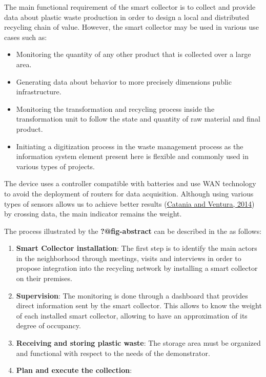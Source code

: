 \documentclass[
  11pt,
]{article}
\providecommand{\tightlist}{%
  \setlength{\itemsep}{0pt}\setlength{\parskip}{0pt}}\usepackage{longtable,booktabs,array}
\begin{document}
The main functional requirement of the smart collector is to collect and
provide data about plastic waste production in order to design a local
and distributed recycling chain of value. However, the smart collector
may be used in various use cases such as:

\begin{itemize}
\tightlist
\item
  Monitoring the quantity of any other product that is collected over a
  large area.\\
\item
  Generating data about behavior to more precisely dimensions public
  infrastructure.\\
\item
  Monitoring the transformation and recycling process inside the
  transformation unit to follow the state and quantity of raw material
  and final product.\\
\item
  Initiating a digitization process in the waste management process as
  the information system element present here is flexible and commonly
  used in various types of projects.
\end{itemize}

The device uses a controller compatible with batteries and use WAN
technology to avoid the deployment of routers for data acquisition.
Although using various types of sensors allows us to achieve better
results (\protect\hyperlink{ref-Catania2014}{Catania and Ventura, 2014})
by crossing data, the main indicator remains the weight.

The process illustrated by the \textbf{?@fig-abstract} can be described
in the as follows:

\begin{enumerate}
\def\labelenumi{\arabic{enumi}.}
\item
  \textbf{Smart Collector installation}: The first step is to identify
  the main actors in the neighborhood through meetings, visits and
  interviews in order to propose integration into the recycling network
  by installing a smart collector on their premises.
\item
  \textbf{Supervision}: The monitoring is done through a dashboard that
  provides direct information sent by the smart collector. This allows
  to know the weight of each installed smart collector, allowing to have
  an approximation of its degree of occupancy.
\item
  \textbf{Receiving and storing plastic waste}: The storage area must be
  organized and functional with respect to the needs of the
  demonstrator.
\item
  \textbf{Plan and execute the collection}:
\end{enumerate}
\end{document}
